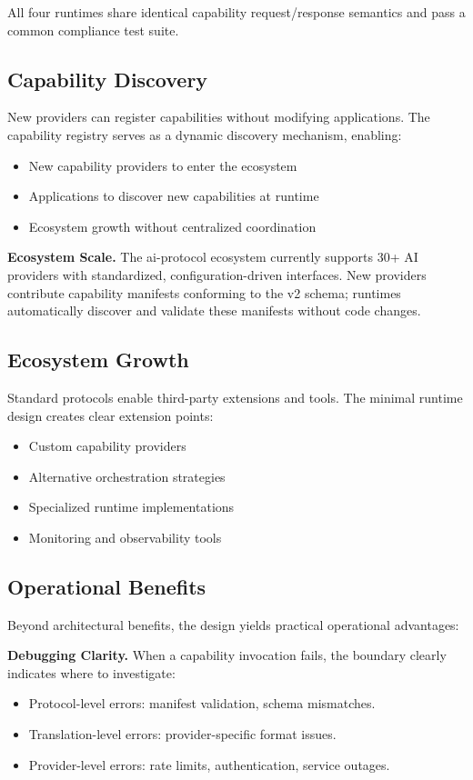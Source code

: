 All four runtimes share identical capability request/response semantics and pass a common compliance test suite.

\subsection{Capability Discovery}

New providers can register capabilities without modifying applications. The capability registry serves as a dynamic discovery mechanism, enabling:
\begin{itemize}
    \item New capability providers to enter the ecosystem
    \item Applications to discover new capabilities at runtime
    \item Ecosystem growth without centralized coordination
\end{itemize}

\textbf{Ecosystem Scale.} The ai-protocol ecosystem currently supports 30+ AI providers with standardized, configuration-driven interfaces. New providers contribute capability manifests conforming to the v2 schema; runtimes automatically discover and validate these manifests without code changes.

\subsection{Ecosystem Growth}

Standard protocols enable third-party extensions and tools. The minimal runtime design creates clear extension points:
\begin{itemize}
    \item Custom capability providers
    \item Alternative orchestration strategies
    \item Specialized runtime implementations
    \item Monitoring and observability tools
\end{itemize}

\subsection{Operational Benefits}

Beyond architectural benefits, the design yields practical operational advantages:

\textbf{Debugging Clarity.} When a capability invocation fails, the boundary clearly indicates where to investigate:
\begin{itemize}
    \item Protocol-level errors: manifest validation, schema mismatches.
    \item Translation-level errors: provider-specific format issues.
    \item Provider-level errors: rate limits, authentication, service outages.
\end{itemize}

